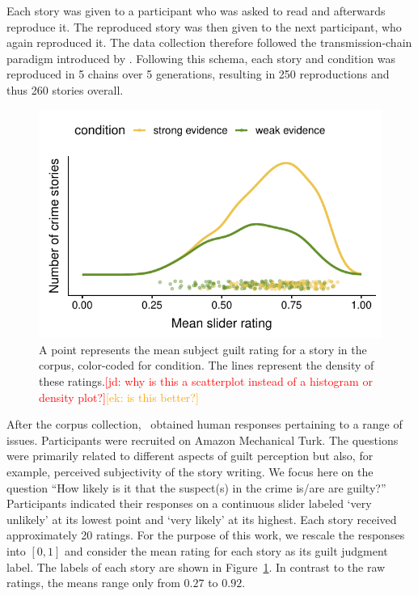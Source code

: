 \documentclass[11pt,a4paper]{article}
\newcommand{\ek}[1]{\textcolor{Orange}{[ek: #1]}}
\newcommand{\jd}[1]{\textcolor{Red}{[jd: #1]}}
\begin{document}
Each story was given to a participant who was asked to read and afterwards reproduce it. The reproduced story was then given to the next participant, who again reproduced it. The data collection therefore followed the transmission-chain paradigm introduced by \citet{Bartlett:1932}. Following this schema, each story and condition was reproduced in 5 chains over 5 generations, resulting in 250 reproductions and thus 260 stories overall.

\begin{figure}[tp]
  \includegraphics[width=\linewidth]{graphs/subjguilt.pdf}
  \caption{A point represents the mean subject guilt rating for a story in the corpus,
    color-coded for condition. The lines represent the density of these ratings.\jd{why is this a scatterplot instead of a histogram or density plot?}\ek{is this better?}}
  \label{fig:corpus-annotations}
\end{figure}

After the corpus collection, \citeauthor{Kreiss:2019}\ obtained human responses pertaining to a range of issues. Participants were recruited on Amazon Mechanical Turk. The questions were primarily related to different aspects of guilt perception but also, for example, perceived subjectivity of the story writing. We focus here on the question ``How likely is it that the suspect(s) in the crime is/are are guilty?'' Participants indicated their responses on a continuous slider labeled `very unlikely' at its lowest point and `very likely' at its highest. Each story received approximately 20 ratings. For the purpose of this work, we rescale the responses into $[0,1]$ and consider the mean rating for each story as its guilt judgment label. The labels of each story are shown in Figure~\ref{fig:corpus-annotations}. In contrast to the raw ratings, the means range only from $0.27$ to $0.92$. 
\end{document}
